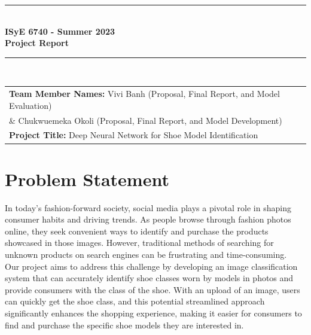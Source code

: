 \documentclass[11pt,a4paper]{article}
\begin{document}

\begin{titlepage}
	\clearpage\thispagestyle{empty}
	\centering
	\vspace{1cm}
		
	\rule{\linewidth}{1mm} \\[0.5cm]
	{ \Large \bfseries ISyE 6740 - Summer 2023\\[0.2cm]
		Project Report}\\[0.5cm]
	\rule{\linewidth}{1mm} \\[1cm]

		\begin{tabular}{l p{5cm}}
		\textbf{Team Member Names:} Vivi Banh (Proposal, Final Report, and Model Evaluation) \\ \& Chukwuemeka Okoli (Proposal, Final Report, and Model Development) \\[10pt]
		\textbf{Project Title:} Deep Neural Network for Shoe Model Identification  \\[10pt]
		\end{tabular} 

\end{titlepage}	
	

\section{Problem Statement}\label{sec1}
In today's fashion-forward society, social media plays a pivotal role in shaping consumer habits and driving trends. As people browse through fashion photos online, they seek convenient ways to identify and purchase the products showcased in those images. However, traditional methods of searching for unknown products on search engines can be frustrating and time-consuming.  \\

\noindent
Our project aims to address this challenge by developing an image classification system that can accurately identify shoe classes worn by models in photos and provide consumers with the class of the shoe. With an upload of an image, users can quickly get the shoe class, and this potential streamlined approach significantly enhances the shopping experience, making it easier for consumers to find and purchase the specific shoe models they are interested in. \\
\end{document}
